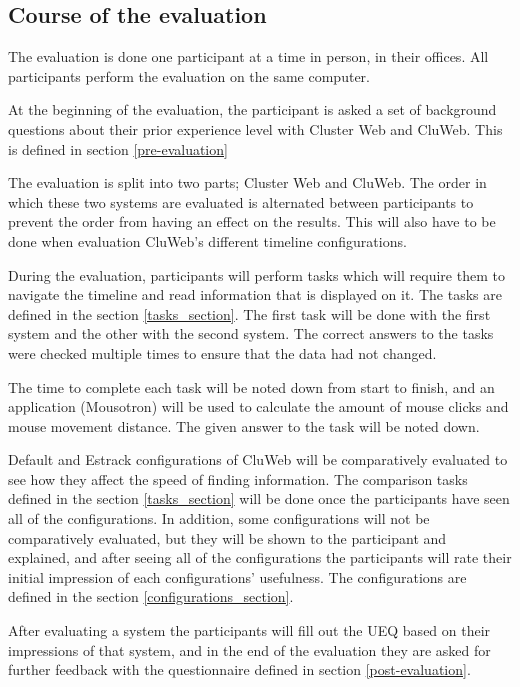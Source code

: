 \subsection{Course of the evaluation}
The evaluation is done one participant at a time in person, in their offices. All participants perform the evaluation on the same computer.

At the beginning of the evaluation, the participant is asked a set of background questions about their prior experience level with Cluster Web and CluWeb. This is defined in section \ref{pre-evaluation}

The evaluation is split into two parts; Cluster Web and CluWeb. The order in which these two systems are evaluated is alternated between participants to prevent the order from having an effect on the results. This will also have to be done when evaluation CluWeb's different timeline configurations.

During the evaluation, participants will perform tasks which will require them to navigate the timeline and read information that is displayed on it. The tasks are defined in the section \ref{tasks_section}. The first task will be done with the first system and the other with the second system. The correct answers to the tasks were checked multiple times to ensure that the data had not changed.

The time to complete each task will be noted down from start to finish, and an application (Mousotron) \cite{mousotron} will be used to calculate the amount of mouse clicks and mouse movement distance. The given answer to the task will be noted down.

Default and Estrack configurations of CluWeb will be comparatively evaluated to see how they affect the speed of finding information. The comparison tasks defined in the section \ref{tasks_section} will be done once the participants have seen all of the configurations. In addition, some configurations will not be comparatively evaluated, but they will be shown to the participant and explained, and after seeing all of the configurations the participants will rate their initial impression of each configurations' usefulness. The configurations are defined in the section \ref{configurations_section}.

 After evaluating a system the participants will fill out the UEQ based on their impressions of that system, and in the end of the evaluation they are asked for further feedback with the questionnaire defined in section \ref{post-evaluation}.

